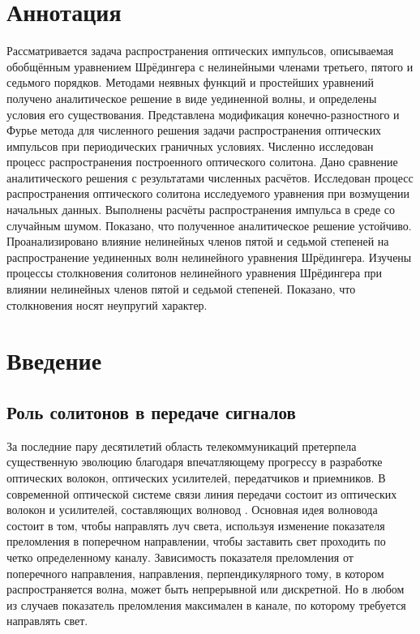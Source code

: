 \documentclass[14pt,a4paper]{extreport}
\begin{document}
	\newpage
	\section*{Аннотация}
		Рассматривается задача распространения оптических импульсов, описываемая обобщённым уравнением Шрёдингера с нелинейными членами третьего, пятого и седьмого порядков. Методами неявных функций и простейших уравнений получено аналитическое решение в виде уединенной волны, и определены условия его существования. Представлена модификация конечно-разностного и Фурье метода для численного решения задачи распространения оптических импульсов при периодических граничных условиях. Численно исследован процесс распространения построенного оптического солитона. Дано сравнение аналитического решения с результатами численных расчётов. Исследован процесс распространения оптического солитона исследуемого уравнения при возмущении начальных данных. Выполнены расчёты распространения импульса в среде со случайным шумом. Показано, что полученное аналитическое решение устойчиво. Проанализировано влияние нелинейных членов пятой и седьмой степеней на распространение уединенных волн нелинейного уравнения Шрёдингера. Изучены процессы столкновения солитонов нелинейного уравнения Шрёдингера при влиянии нелинейных членов пятой и седьмой степеней. Показано, что столкновения носят неупругий характер.

	\newpage
		\tableofcontents
	\newpage

	\section{Введение}\label{Introduction}\label{ch100}
		\subsection{Роль солитонов в передаче сигналов}\label{ch110}
			За последние пару десятилетий область телекоммуникаций претерпела существенную эволюцию благодаря впечатляющему прогрессу в разработке оптических волокон, оптических усилителей, передатчиков и приемников. В современной оптической системе связи линия передачи состоит из оптических волокон и усилителей, составляющих волновод \cite{Rad1}. Основная идея волновода состоит в том, чтобы направлять луч света, используя изменение показателя преломления в поперечном направлении, чтобы заставить свет проходить по четко определенному каналу. Зависимость показателя преломления от поперечного направления, направления, перпендикулярного тому, в котором распространяется волна, может быть непрерывной или дискретной. Но в любом из случаев показатель преломления максимален в канале, по которому требуется направлять свет. \\
\end{document}
